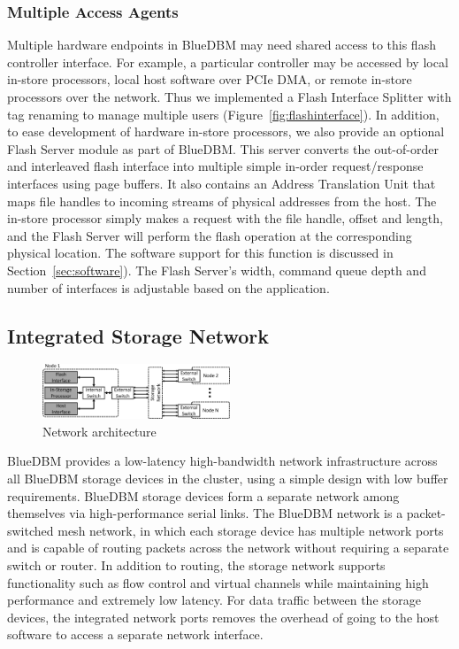 \subsubsection{Multiple Access Agents}

Multiple hardware endpoints in BlueDBM may need shared access to this
flash controller interface. For example, a particular controller may
be accessed by local in-store processors, local host software over PCIe
DMA, or remote in-store processors over the network. Thus we implemented a
Flash Interface Splitter with tag renaming to manage multiple users
(Figure~\ref{fig:flashinterface}). In addition, 
to ease development of hardware in-store processors,
we also provide an optional Flash Server module as part of BlueDBM. This server
converts the out-of-order and interleaved flash interface into
multiple simple in-order request/response interfaces
using page buffers. It also contains an Address Translation Unit that 
maps file handles to incoming streams of physical addresses from the host. The in-store processor
simply makes a request with the file handle, offset and length, and the Flash Server will perform
the flash operation at the corresponding physical location. The software
support for this function is discussed in Section~\ref{sec:software}). The Flash
Server's width, command queue depth and number of interfaces is adjustable 
based on the application.

\subsection{Integrated Storage Network}

\begin{figure}[b]
	\begin{center}
	\includegraphics[width=0.5\textwidth]{figures/network-architecture-crop.pdf}
	\caption{Network architecture}
	\label{fig:networkinterface}
	\end{center}
\end{figure}


BlueDBM provides a low-latency high-bandwidth network infrastructure across
all BlueDBM storage devices in the cluster, using a simple design with low buffer requirements. BlueDBM storage devices form a separate network
among themselves via high-performance serial links.  The BlueDBM network is a
packet-switched mesh network, in which each storage device has multiple network
ports and is capable of routing packets across the network without requiring a
separate switch or router.  In addition to routing, the storage network supports functionality such as
flow control and virtual channels while maintaining high performance and
extremely low latency.  For data traffic between the storage devices, the
integrated network ports removes the overhead of going to the host software to
access a separate network interface.

